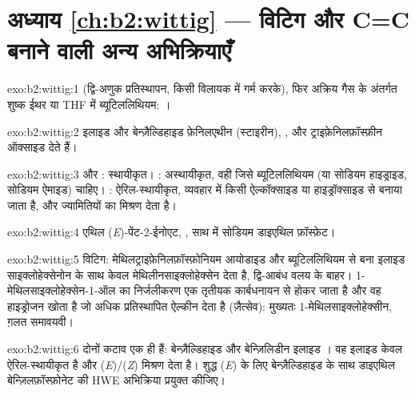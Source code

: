 \section*{अध्याय \ref{ch:b2:wittig} --- विटिग और C=C बनाने वाली अन्य अभिक्रियाएँ}

\begin{solution}{exo:b2:wittig:1}
 (द्वि-अणुक प्रतिस्थापन, किसी विलायक में गर्म करके), फिर
अक्रिय गैस के अंतर्गत शुष्क ईथर या THF में ब्यूटिललिथियम: ।
\end{solution}

\begin{solution}{exo:b2:wittig:2}
इलाइड  और बेन्ज़ैल्डिहाइड फ़ेनिलएथीन (स्टाइरीन), , और
ट्राइफ़ेनिलफ़ॉस्फ़ीन ऑक्साइड देते हैं।
\end{solution}

\begin{solution}{exo:b2:wittig:3}
 और : स्थायीकृत। : अस्थायीकृत, वही जिसे
ब्यूटिललिथियम (या सोडियम हाइड्राइड, सोडियम ऐमाइड) चाहिए। : ऐरिल-स्थायीकृत, व्यवहार में किसी
ऐल्कॉक्साइड या हाइड्रॉक्साइड से बनाया जाता है, और ज्यामितियों का मिश्रण देता है।
\end{solution}

\begin{solution}{exo:b2:wittig:4}
एथिल (\textit{E})-पेंट-2-ईनोएट, , साथ में सोडियम डाइएथिल फ़ॉस्फ़ेट।
\end{solution}

\begin{solution}{exo:b2:wittig:5}
विटिग: मेथिलट्राइफ़ेनिलफ़ॉस्फ़ोनियम आयोडाइड और ब्यूटिललिथियम से बना इलाइड  साइक्लोहेक्सेनोन के साथ केवल
मेथिलीनसाइक्लोहेक्सेन देता है, द्वि-आबंध वलय के बाहर। 1-मेथिलसाइक्लोहेक्सेन-1-ऑल का निर्जलीकरण
एक तृतीयक कार्बधनायन से होकर जाता है और वह हाइड्रोजन खोता है जो अधिक प्रतिस्थापित ऐल्कीन देता है (ज़ैत्सेव):
मुख्यतः 1-मेथिलसाइक्लोहेक्सीन, ग़लत समावयवी।
\end{solution}

\begin{solution}{exo:b2:wittig:6}
दोनों कटाव एक ही हैं: बेन्ज़ैल्डिहाइड और बेन्ज़िलिडीन इलाइड । वह इलाइड केवल
ऐरिल-स्थायीकृत है और (\textit{E})/(\textit{Z}) मिश्रण देता है। शुद्ध (\textit{E}) के लिए बेन्ज़ैल्डिहाइड के साथ
डाइएथिल बेन्ज़िलफ़ॉस्फ़ोनेट की HWE अभिक्रिया प्रयुक्त कीजिए।
\end{solution}


